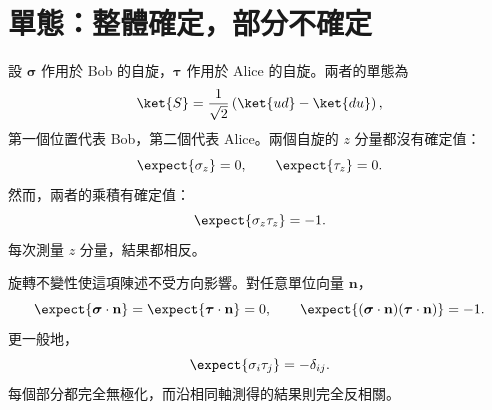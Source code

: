\begin{classroomqa}
\end{classroomqa}

\begin{classroomqa}
\end{classroomqa}

\begin{classroomqa}
\end{classroomqa}

\section{單態：整體確定，部分不確定}

設 \(\boldsymbol{\sigma}\) 作用於 Bob 的自旋，\(\boldsymbol{\tau}\) 作用於 Alice 的自旋。兩者的單態為
\begin{equation}
\ket{S}
=\frac{1}{\sqrt2}
\left(\ket{u d}-\ket{d u}\right),
\label{eq:l7-singlet}
\end{equation}
第一個位置代表 Bob，第二個代表 Alice。兩個自旋的 \(z\) 分量都沒有確定值：
\begin{equation}
\expect{\sigma_z}=0,
\qquad
\expect{\tau_z}=0.
\label{eq:l7-singlet-local-z}
\end{equation}
然而，兩者的乘積有確定值：
\begin{equation}
\expect{\sigma_z\tau_z}=-1.
\label{eq:l7-singlet-product-z}
\end{equation}
每次測量 \(z\) 分量，結果都相反。

旋轉不變性使這項陳述不受方向影響。對任意單位向量 \(\mathbf n\)，
\begin{equation}
\expect{\boldsymbol{\sigma}\cdot\mathbf n}
=\expect{\boldsymbol{\tau}\cdot\mathbf n}=0,
\qquad
\expect{
(\boldsymbol{\sigma}\cdot\mathbf n)
(\boldsymbol{\tau}\cdot\mathbf n)
}=-1.
\label{eq:l7-singlet-any-axis}
\end{equation}
更一般地，
\begin{equation}
\expect{\sigma_i\tau_j}=-\delta_{ij}.
\label{eq:l7-singlet-correlation-tensor}
\end{equation}
每個部分都完全無極化，而沿相同軸測得的結果則完全反相關。

